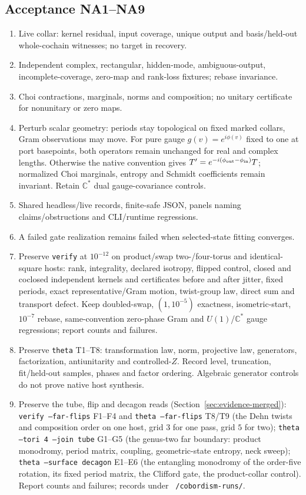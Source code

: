 \documentclass[11pt]{article}
\theoremstyle{definition}
\theoremstyle{remark}
\newcommand{\C}{\mathbb{C}}
\begin{document}
\subsection{Acceptance NA1--NA9}
\begin{enumerate}[label=NA\arabic*.,leftmargin=*]
\item Live collar: kernel residual, input coverage, unique output and
basis/held-out whole-cochain witnesses; no target in recovery.
\item Independent complex, rectangular, hidden-mode, ambiguous-output,
incomplete-coverage, zero-map and rank-loss fixtures; rebase invariance.
\item Choi contractions, marginals, norms and composition;
no unitary certificate for nonunitary or zero maps.
\item Perturb scalar geometry: periods stay topological on fixed marked
collars, Gram observations may move. For pure gauge $g(v)=e^{i\phi(v)}$
fixed to one at port basepoints, both operators remain unchanged for real
and complex lengths. Otherwise the native convention gives
$T'=e^{-i(\phi_{\rm out}-\phi_{\rm in})}T$; normalized Choi marginals,
entropy and Schmidt coefficients remain invariant. Retain $\C^*$ dual
gauge-covariance controls.
\item Shared headless/live records, finite-safe JSON, panels naming
claims/obstructions and CLI/runtime regressions.
\item A failed gate realization remains failed when selected-state fitting converges.
\item Preserve \texttt{verify} at $10^{-12}$ on product/swap two-/four-torus
and identical-square hosts: rank, integrality, declared isotropy, flipped
control, closed and coclosed independent kernels and certificates before and after
jitter, fixed periods, exact representative/Gram motion, twist-group law,
direct sum and transport defect. Keep doubled-swap, $(1,10^{-5})$ exactness,
isometric-start, $10^{-7}$ rebase, same-convention zero-phase Gram and
$U(1)$/$\C^*$ gauge regressions; report counts and failures.
\item Preserve \texttt{theta} T1--T8: transformation law, norm, projective
law, generators, factorization, antiunitarity and controlled-$Z$.
Record level, truncation, fit/held-out samples, phases and factor ordering.
Algebraic generator controls do not prove native host synthesis.
\item Preserve the tube, flip and decagon reads (Section~\ref{sec:evidence-merged}):
\texttt{verify --far-flips} F1--F4 and \texttt{theta --far-flips} T8/T9
(the Dehn twists and composition order on one host, grid $3$ for one pass,
grid $5$ for two); \texttt{theta --tori 4 --join tube} G1--G5 (the
genus-two far boundary: product monodromy, period matrix, coupling,
geometric-state entropy, neck sweep); \texttt{theta --surface decagon}
E1--E6 (the entangling monodromy of the order-five rotation, its fixed
period matrix, the Clifford gate, the product-collar control). Report
counts and failures; records under \texttt{\string~/cobordism-runs/}.
\end{enumerate}
\end{document}
